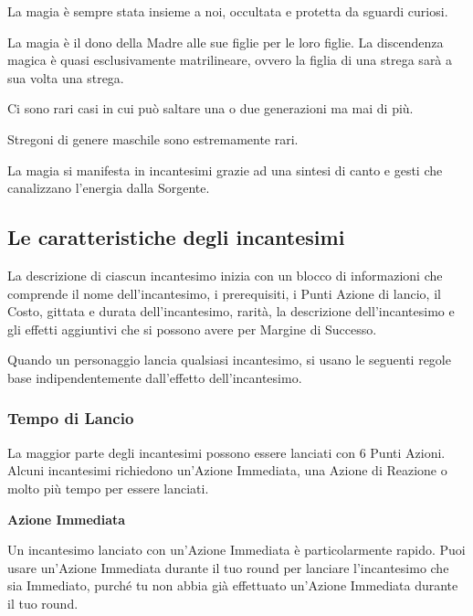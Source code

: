 \documentclass[12pt,a4paper,twoside,openany]{book}
\begin{document}
\begin{multicols}{2}
	
La magia è sempre stata insieme a noi, occultata e protetta da sguardi curiosi.

La magia è il dono della Madre alle sue figlie per le loro figlie.
La discendenza magica è quasi esclusivamente matrilineare, ovvero la figlia di una strega sarà a sua volta una strega.

Ci sono rari casi in cui può saltare una o due generazioni ma mai di più.

Stregoni di genere maschile sono estremamente rari.

La magia si manifesta in incantesimi grazie ad una sintesi di canto e gesti che canalizzano l'energia dalla Sorgente.

\subsection{Le caratteristiche degli incantesimi}\label{caratteristicheincantesimi}

La descrizione di ciascun incantesimo inizia con un blocco di informazioni che comprende il nome dell'incantesimo, i prerequisiti, i Punti Azione di lancio, il Costo, gittata e durata dell'incantesimo, rarità, la descrizione dell'incantesimo e gli effetti aggiuntivi che si possono avere per Margine di Successo.

Quando un personaggio lancia qualsiasi incantesimo, si usano le seguenti regole base indipendentemente dall'effetto dell'incantesimo.

\subsubsection{Tempo di Lancio}\label{magietempodilancio}

La maggior parte degli incantesimi possono essere lanciati con 6 Punti Azioni. Alcuni incantesimi richiedono un'Azione Immediata, una Azione di Reazione o molto più tempo per essere lanciati.

\textbf{Azione Immediata}

Un incantesimo lanciato con un'Azione Immediata è particolarmente rapido. Puoi usare un'Azione Immediata durante il tuo round per lanciare l'incantesimo che sia Immediato, purché tu non abbia già effettuato un'Azione Immediata durante il tuo round.


\end{multicols}
\end{document}
